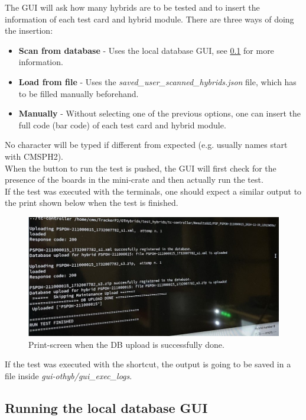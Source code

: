 \documentclass[10pt,a4paper]{article}
\begin{document}
The GUI will ask how many hybrids are to be tested and to insert the information of each test card and hybrid module. There are three ways of doing the insertion:

\begin{itemize}
    \item \textbf{Scan from database} - Uses the local database GUI, see \ref{scanner} for more information.
    \item \textbf{Load from file}  - Uses the \textit{saved\_user\_scanned\_hybrids.json} file, which has to be filled manually beforehand.
    \item \textbf{Manually} - Without selecting one of the previous options, one can insert the full code (bar code) of each test card and hybrid module. 
\end{itemize}

No character will be typed if different from expected (e.g. usually names start with CMSPH2). \\
When the button to run the test is pushed, the GUI will first check for the presence of the boards in the mini-crate and then actually run the test. \\

If the test was executed with the terminals, one should expect a similar output to the print shown below when the test is finished. 

\begin{figure}[h!]
\centering
 \includegraphics[width=1.0\linewidth]{Pictures/DBupload-success.jpg} 
  \caption{Print-screen when the DB upload is successfully done.}
  \label{DBupload}
\end{figure}

If the test was executed with the shortcut, the output is going to be saved in a file inside \emph{gui-othyb/gui\_exec\_logs}.

\subsection{Running the local database GUI}
\label{scanner}
\end{document}
